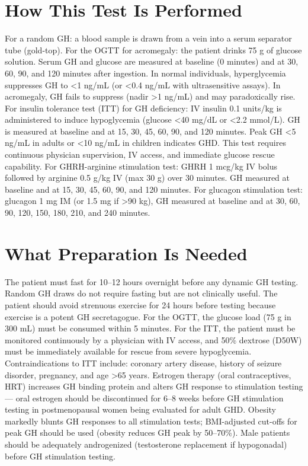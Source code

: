 \section*{How This Test Is Performed}
For a random GH: a blood sample is drawn from a vein into a serum separator tube (gold-top). For the OGTT for acromegaly: the patient drinks 75 g of glucose solution. Serum GH and glucose are measured at baseline (0 minutes) and at 30, 60, 90, and 120 minutes after ingestion. In normal individuals, hyperglycemia suppresses GH to <1 ng/mL (or <0.4 ng/mL with ultrasensitive assays). In acromegaly, GH fails to suppress (nadir >1 ng/mL) and may paradoxically rise. For insulin tolerance test (ITT) for GH deficiency: IV insulin 0.1 units/kg is administered to induce hypoglycemia (glucose <40 mg/dL or <2.2 mmol/L). GH is measured at baseline and at 15, 30, 45, 60, 90, and 120 minutes. Peak GH <5 ng/mL in adults or <10 ng/mL in children indicates GHD. This test requires continuous physician supervision, IV access, and immediate glucose rescue capability. For GHRH-arginine stimulation test: GHRH 1 mcg/kg IV bolus followed by arginine 0.5 g/kg IV (max 30 g) over 30 minutes. GH measured at baseline and at 15, 30, 45, 60, 90, and 120 minutes. For glucagon stimulation test: glucagon 1 mg IM (or 1.5 mg if >90 kg), GH measured at baseline and at 30, 60, 90, 120, 150, 180, 210, and 240 minutes.

\section*{What Preparation Is Needed}
The patient must fast for 10--12 hours overnight before any dynamic GH testing. Random GH draws do not require fasting but are not clinically useful. The patient should avoid strenuous exercise for 24 hours before testing because exercise is a potent GH secretagogue. For the OGTT, the glucose load (75 g in 300 mL) must be consumed within 5 minutes. For the ITT, the patient must be monitored continuously by a physician with IV access, and 50\% dextrose (D50W) must be immediately available for rescue from severe hypoglycemia. Contraindications to ITT include: coronary artery disease, history of seizure disorder, pregnancy, and age >65 years. Estrogen therapy (oral contraceptives, HRT) increases GH binding protein and alters GH response to stimulation testing --- oral estrogen should be discontinued for 6--8 weeks before GH stimulation testing in postmenopausal women being evaluated for adult GHD. Obesity markedly blunts GH responses to all stimulation tests; BMI-adjusted cut-offs for peak GH should be used (obesity reduces GH peak by 50--70\%). Male patients should be adequately androgenized (testosterone replacement if hypogonadal) before GH stimulation testing.


